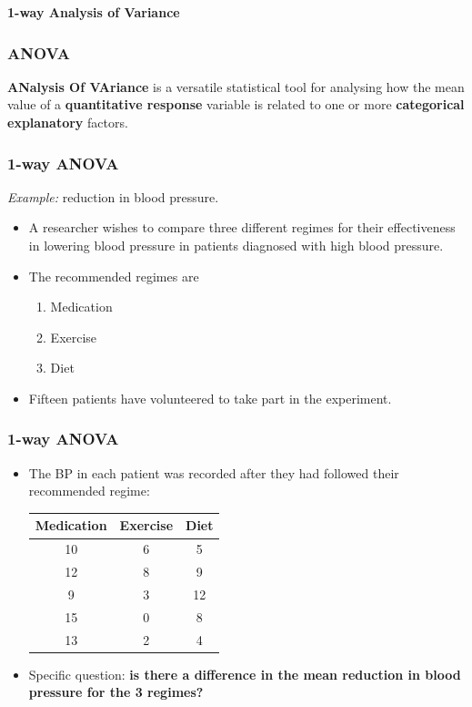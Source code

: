 \documentclass[12pt,xcolor=dvipsnames,handout,mathserif,aspectratio=169]{beamer}
\newcommand{\bbl}[1]{{\color{NavyBlue} \textbf{#1}}}
\begin{document}
\begin{frame}
\huge{\bbl{1-way Analysis of Variance}}
\end{frame}


\begin{frame}\frametitle{ANOVA}
\begin{center}
\bbl{ANalysis Of VAriance} is a versatile 
statistical tool for analysing how the mean value of a \textbf{quantitative response} variable is related to one or more \textbf{categorical explanatory} factors. 
\end{center}
\end{frame}



\begin{frame}\frametitle{1-way ANOVA}
\emph{Example:} reduction in blood pressure.
\vspace{0.3cm}
\begin{itemize}
\item A researcher wishes to compare three different regimes for their
effectiveness in lowering blood pressure in patients diagnosed
with high blood pressure. 
\vspace{0.3cm}
\item The recommended regimes are
\begin{enumerate}
\item Medication
\item Exercise
\item Diet
\end{enumerate}
\vspace*{0.3cm}
\item Fifteen patients have volunteered to take part in the experiment.
\end{itemize}
\end{frame}


\begin{frame}\frametitle{1-way ANOVA}
\begin{itemize}
\item The BP in each patient was recorded after they had followed their recommended regime:
\vspace*{0.5cm}
\begin{center}
{\small{
\begin{tabular}{ccc} \hline
Medication& Exercise& Diet \\ \hline
10& 6& 5\\
12& 8& 9\\
9& 3& 12\\
15& 0& 8\\
13 &2& 4\\ \hline
\end{tabular}}}
\end{center}
\vspace*{0.5cm}

\item{Specific question:} \bbl{is there a difference in the mean reduction in blood pressure for the 3 regimes?}
\end{itemize}
\end{frame}
\end{document}
